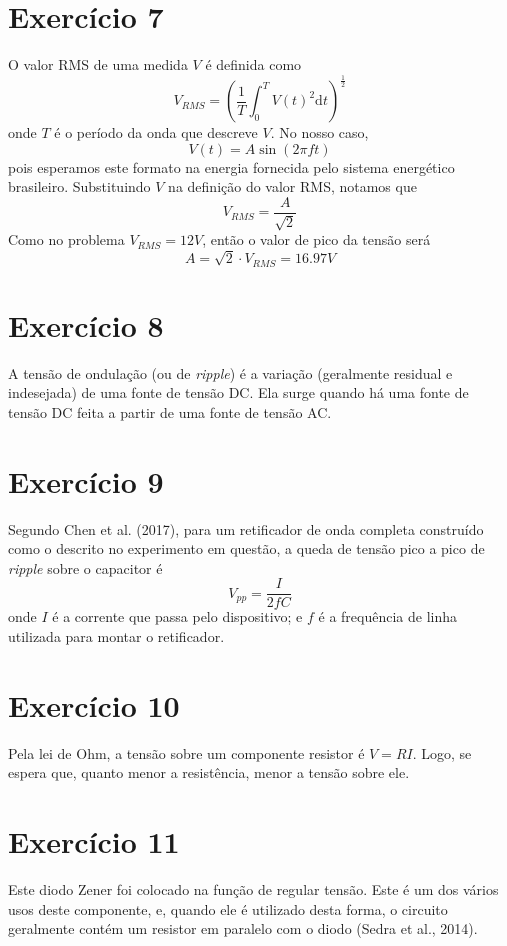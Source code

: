 \documentclass[12pt, a4paper, twoside]{article}
\begin{document}
\section{Exercício 7}

O valor RMS de uma medida $V$ é definida como
$$ V_{RMS} = \left( \frac{1}{T} \int_0^T V(t)^2 \mathrm{d}t \right)^{\frac{1}{2}} $$
onde $T$ é o período da onda que descreve $V$. No nosso caso,
$$ V(t) = A \sin(2 \pi f t) $$
pois esperamos este formato na energia fornecida pelo sistema energético brasileiro. Substituindo $V$ na definição do valor RMS, notamos que
$$ V_{RMS} = \frac{A}{\sqrt{2}} $$
Como no problema $V_{RMS} = 12V$, então o valor de pico da tensão será
$$ A = \sqrt{2} \cdot V_{RMS} = 16.97V $$

\section{Exercício 8}

A tensão de ondulação (ou de \textit{ripple}) é a variação (geralmente residual e indesejada) de uma fonte de tensão DC. Ela surge quando há uma fonte de tensão DC feita a partir de uma fonte de tensão AC.

\section{Exercício 9}

Segundo Chen et al. (2017), para um retificador de onda completa construído como o descrito no experimento em questão, a queda de tensão pico a pico de \textit{ripple} sobre o capacitor é $$V_{pp} = \frac{I}{2fC}$$ onde $I$ é a corrente que passa pelo dispositivo; e $f$ é a frequência de linha utilizada para montar o retificador.

\section{Exercício 10}

Pela lei de Ohm, a tensão sobre um componente resistor é $V=RI$. Logo, se espera que, quanto menor a resistência, menor a tensão sobre ele.

\section{Exercício 11}

Este diodo Zener foi colocado na função de regular tensão. Este é um dos vários usos deste componente, e, quando ele é utilizado desta forma, o circuito geralmente contém um resistor em paralelo com o diodo (Sedra et al., 2014).
\end{document}
